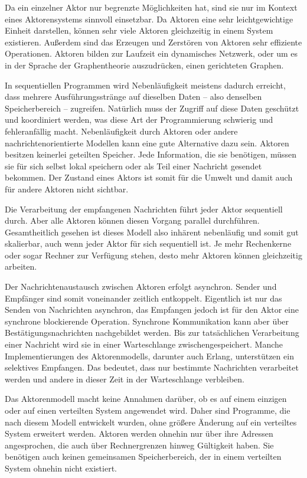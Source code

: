 Da ein einzelner Aktor nur begrenzte Möglichkeiten hat, sind sie nur im Kontext eines Aktorensystems sinnvoll einsetzbar. Da Aktoren eine sehr leichtgewichtige Einheit darstellen, können sehr viele Aktoren gleichzeitig in einem System existieren. Außerdem sind das Erzeugen und Zerstören von Aktoren sehr effiziente Operationen. Aktoren bilden zur Laufzeit ein dynamisches Netzwerk, oder um es in der Sprache der Graphentheorie auszudrücken, einen gerichteten Graphen.

In sequentiellen Programmen wird Nebenläufigkeit meistens dadurch erreicht, dass mehrere Ausführungsstränge auf dieselben Daten -- also denselben Speicherbereich -- zugreifen. Natürlich muss der Zugriff auf diese Daten geschützt und koordiniert werden, was diese Art der Programmierung schwierig und fehleranfällig macht. Nebenläufigkeit durch Aktoren oder andere nachrichtenorientierte Modellen kann eine gute Alternative dazu sein. Aktoren besitzen keinerlei geteilten Speicher. Jede Information, die sie benötigen, müssen sie für sich selbst lokal speichern oder als Teil einer Nachricht gesendet bekommen. Der Zustand eines Aktors ist somit für die Umwelt und damit auch für andere Aktoren nicht sichtbar.

Die Verarbeitung der empfangenen Nachrichten führt jeder Aktor sequentiell durch. Aber alle Aktoren können diesen Vorgang parallel durchführen. Gesamtheitlich gesehen ist dieses Modell also inhärent nebenläufig und somit gut skalierbar, auch wenn jeder Aktor für sich sequentiell ist. Je mehr Rechenkerne oder sogar Rechner zur Verfügung stehen, desto mehr Aktoren können gleichzeitig arbeiten.

Der Nachrichtenaustausch zwischen Aktoren erfolgt asynchron. Sender und Empfänger sind somit voneinander zeitlich entkoppelt.  Eigentlich ist nur das Senden von Nachrichten asynchron, das Empfangen jedoch ist für den Aktor eine synchrone \bzw blockierende Operation. Synchrone Kommunikation kann aber über Bestätigungsnachrichten nachgebildet werden. Bis zur tatsächlichen Verarbeitung einer Nachricht wird sie in einer Warteschlange zwischengespeichert. Manche Implementierungen des Aktorenmodells, darunter auch Erlang, unterstützen ein selektives Empfangen. Das bedeutet, dass nur bestimmte Nachrichten verarbeitet werden und andere in dieser Zeit in der Warteschlange verbleiben.

Das Aktorenmodell macht keine Annahmen darüber, ob es auf einem einzigen oder auf einen verteilten System angewendet wird. Daher sind Programme, die nach diesem Modell entwickelt wurden, ohne größere Änderung auf ein verteiltes System erweitert werden. Aktoren werden ohnehin nur über ihre Adressen angesprochen, die auch über Rechnergrenzen hinweg Gültigkeit haben. Sie benötigen auch keinen gemeinsamen Speicherbereich, der in einem verteilten System ohnehin nicht existiert.

